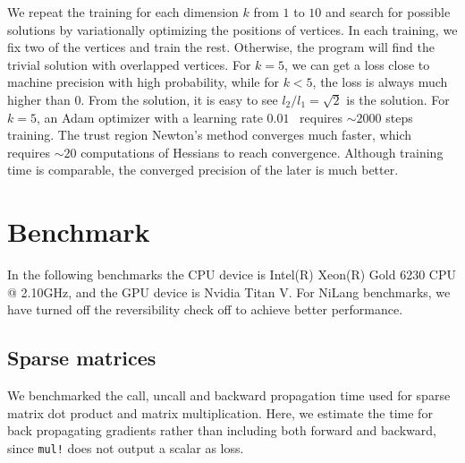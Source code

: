 \documentclass{article}
\newcommand{\<}{\langle}
\renewcommand{\>}{\rangle}
\newcommand{\ra}[1]{\renewcommand{\arraystretch}{#1}}
\theoremstyle{definition}\newtheorem{definition}{\textit{Definition}}
\begin{document}
We repeat the training for each dimension $k$ from $1$ to $10$ and search for possible solutions by variationally optimizing the positions of vertices.
In each training, we fix two of the vertices and train the rest. Otherwise, the program will find the trivial solution with overlapped vertices. 
For $k=5$, we can get a loss close to machine precision with high probability, while for $k < 5$, the loss is always much higher than $0$.
From the solution, it is easy to see $l_2/l_1 = \sqrt{2}$ is the solution.
For $k=5$, an Adam optimizer with a learning rate $0.01$~\cite{Kingma2014} requires $\sim2000$ steps training.
The trust region Newton's method converges much faster, which requires $\sim 20$ computations of Hessians to reach convergence.
Although training time is comparable, the converged precision of the later is much better.

\section{Benchmark}\label{sec:benchmark}

In the following benchmarks the CPU device is Intel(R) Xeon(R) Gold 6230 CPU @ 2.10GHz, and the GPU device is Nvidia Titan V.
For NiLang benchmarks, we have turned off the reversibility check off to achieve better performance.

\subsection{Sparse matrices}\label{sec:benchsparse}
We benchmarked the call, uncall and backward propagation time used for sparse matrix dot product and matrix multiplication.
Here, we estimate the time for back propagating gradients rather than including both forward and backward, since \texttt{mul!} does not output a scalar as loss.

\begin{table}[h!]\centering
\begin{minipage}{0.8\columnwidth}
\ra{1.3}
    \caption{Absolute runtimes in seconds for computing the objectives (O) and the backward pass (B) of sparse matrix operations. The matrix size is $1000 \times 1000$, and the element density is $0.05$. The total time used in computing gradient can be estimated as a sum of ``O'' and ``B''.
    }\label{tbl:sparse}
\end{minipage}
\end{table}
\end{document}
